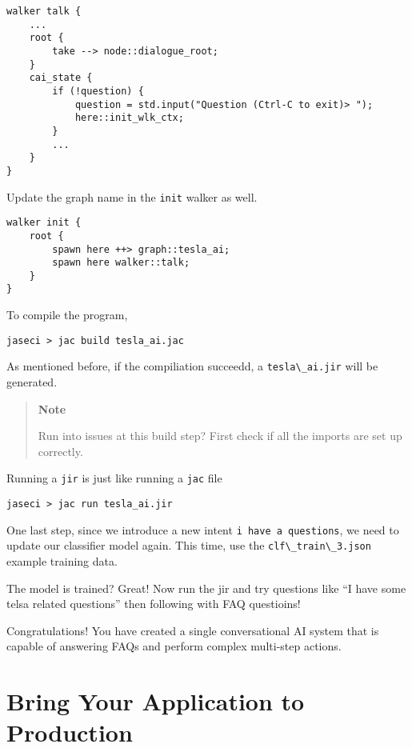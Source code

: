 \begin{lstlisting}
walker talk {
    ...
    root {
        take --> node::dialogue_root;
    }
    cai_state {
        if (!question) {
            question = std.input("Question (Ctrl-C to exit)> ");
            here::init_wlk_ctx;
        }
        ...
    }
}
\end{lstlisting}

Update the graph name in the \passthrough{\lstinline!init!} walker as
well.

\begin{lstlisting}
walker init {
    root {
        spawn here ++> graph::tesla_ai;
        spawn here walker::talk;
    }
}
\end{lstlisting}

To compile the program,

\begin{lstlisting}
jaseci > jac build tesla_ai.jac
\end{lstlisting}

As mentioned before, if the compiliation succeedd, a
\passthrough{\lstinline!tesla\_ai.jir!} will be generated.

\begin{quote}
\textbf{Note}

Run into issues at this build step? First check if all the imports are
set up correctly.
\end{quote}

Running a \passthrough{\lstinline!jir!} is just like running a
\passthrough{\lstinline!jac!} file

\begin{lstlisting}
jaseci > jac run tesla_ai.jir
\end{lstlisting}

One last step, since we introduce a new intent
\passthrough{\lstinline!i have a questions!}, we need to update our
classifier model again. This time, use the
\passthrough{\lstinline!clf\_train\_3.json!} example training data.

The model is trained? Great! Now run the jir and try questions like ``I
have some telsa related questions'' then following with FAQ questioins!

Congratulations! You have created a single conversational AI system that
is capable of answering FAQs and perform complex multi-step actions.

\hypertarget{bring-your-application-to-production}{%
\section{Bring Your Application to
Production}\label{bring-your-application-to-production}}

